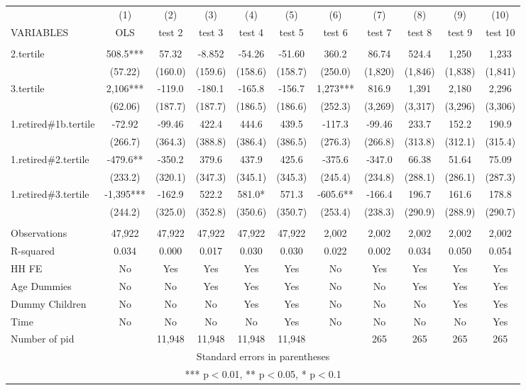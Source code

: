 \begin{tabular}{lcccccccccc} \hline
 & (1) & (2) & (3) & (4) & (5) & (6) & (7) & (8) & (9) & (10) \\
VARIABLES & OLS & test 2 & test 3 & test 4 & test 5 & test 6 & test 7 & test 8 & test 9 & test 10 \\ \hline
 &  &  &  &  &  &  &  &  &  &  \\
2.tertile & 508.5*** & 57.32 & -8.852 & -54.26 & -51.60 & 360.2 & 86.74 & 524.4 & 1,250 & 1,233 \\
 & (57.22) & (160.0) & (159.6) & (158.6) & (158.7) & (250.0) & (1,820) & (1,846) & (1,838) & (1,841) \\
3.tertile & 2,106*** & -119.0 & -180.1 & -165.8 & -156.7 & 1,273*** & 816.9 & 1,391 & 2,180 & 2,296 \\
 & (62.06) & (187.7) & (187.7) & (186.5) & (186.6) & (252.3) & (3,269) & (3,317) & (3,296) & (3,306) \\
1.retired\#1b.tertile & -72.92 & -99.46 & 422.4 & 444.6 & 439.5 & -117.3 & -99.46 & 233.7 & 152.2 & 190.9 \\
 & (266.7) & (364.3) & (388.8) & (386.4) & (386.5) & (276.3) & (266.8) & (313.8) & (312.1) & (315.4) \\
1.retired\#2.tertile & -479.6** & -350.2 & 379.6 & 437.9 & 425.6 & -375.6 & -347.0 & 66.38 & 51.64 & 75.09 \\
 & (233.2) & (320.1) & (347.3) & (345.1) & (345.3) & (245.4) & (234.8) & (288.1) & (286.1) & (287.3) \\
1.retired\#3.tertile & -1,395*** & -162.9 & 522.2 & 581.0* & 571.3 & -605.6** & -166.4 & 196.7 & 161.6 & 178.8 \\
 & (244.2) & (325.0) & (352.8) & (350.6) & (350.7) & (253.4) & (238.3) & (290.9) & (288.9) & (290.7) \\
 &  &  &  &  &  &  &  &  &  &  \\
Observations & 47,922 & 47,922 & 47,922 & 47,922 & 47,922 & 2,002 & 2,002 & 2,002 & 2,002 & 2,002 \\
R-squared & 0.034 & 0.000 & 0.017 & 0.030 & 0.030 & 0.022 & 0.002 & 0.034 & 0.050 & 0.054 \\
HH FE & No & Yes & Yes & Yes & Yes & No & Yes & Yes & Yes & Yes \\
Age Dummies & No & No & Yes & Yes & Yes & No & No & Yes & Yes & Yes \\
Dummy Children & No & No & No & Yes & Yes & No & No & No & Yes & Yes \\
Time & No & No & No & No & Yes & No & No & No & No & Yes \\
 Number of pid &  & 11,948 & 11,948 & 11,948 & 11,948 &  & 265 & 265 & 265 & 265 \\ \hline
\multicolumn{11}{c}{ Standard errors in parentheses} \\
\multicolumn{11}{c}{ *** p$<$0.01, ** p$<$0.05, * p$<$0.1} \\
\end{tabular}
